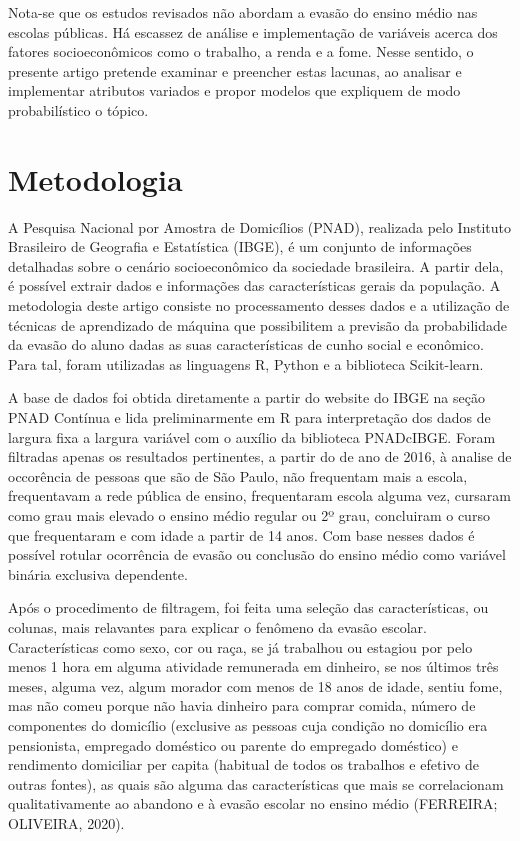 \documentclass[english, spanish, brazilian]{RBIEarticle} %
\begin{document}
Nota-se que os estudos revisados não abordam a evasão do ensino médio nas escolas públicas. Há escassez de análise e implementação de variáveis acerca dos fatores socioeconômicos como o trabalho, a renda e a fome. Nesse sentido, o presente artigo pretende examinar e preencher estas lacunas, ao analisar e implementar atributos variados e propor modelos que expliquem de modo probabilístico o tópico.

\section{Metodologia}
A Pesquisa Nacional por Amostra de Domicílios (PNAD), realizada pelo Instituto Brasileiro de Geografia e Estatística (IBGE), é um conjunto de informações detalhadas sobre o cenário socioeconômico da sociedade brasileira. A partir dela, é possível extrair dados e informações das características gerais da população. A metodologia deste artigo consiste no processamento desses dados e a utilização de técnicas de aprendizado de máquina que possibilitem a previsão da probabilidade da evasão do aluno dadas as suas características de cunho social e econômico. Para tal, foram utilizadas as linguagens R, Python e a biblioteca Scikit-learn.

A base de dados foi obtida diretamente a partir do website do IBGE na seção PNAD Contínua e lida preliminarmente em R para interpretação dos dados de largura fixa a largura variável com o auxílio da biblioteca PNADcIBGE. Foram filtradas apenas os resultados pertinentes, a partir do de ano de 2016, à analise de occorência de pessoas que são de São Paulo, não frequentam mais a escola, frequentavam a rede pública de ensino, frequentaram escola alguma vez, cursaram como grau mais elevado o ensino médio regular ou 2º grau, concluiram o curso que frequentaram e com idade a partir de 14 anos. Com base nesses dados é possível rotular ocorrência de evasão ou conclusão do ensino médio como variável binária exclusiva dependente.

Após o procedimento de filtragem, foi feita uma seleção das características, ou colunas, mais relavantes para explicar o fenômeno da evasão escolar. Características como sexo, cor ou raça, se já trabalhou ou estagiou por pelo menos 1 hora em alguma atividade remunerada em dinheiro, se nos últimos três meses, alguma vez, algum morador com menos de 18 anos de idade, sentiu fome, mas não comeu porque não havia dinheiro para comprar comida, número de componentes do domicílio (exclusive as pessoas cuja condição no domicílio era pensionista, empregado doméstico ou parente do empregado doméstico) e rendimento domiciliar per capita
(habitual de todos os trabalhos e efetivo de outras fontes), as quais são alguma das características que mais se correlacionam qualitativamente ao abandono e à evasão escolar no ensino médio (FERREIRA; OLIVEIRA, 2020).
\end{document}
